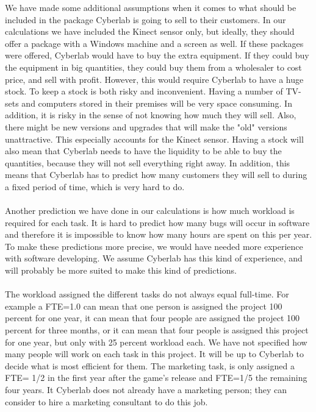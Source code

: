 We have made some additional assumptions when it comes to what should be included in the package Cyberlab is going to sell to their customers. In our calculations we have included the Kinect sensor only, but ideally, they should offer a package with a Windows machine and a screen as well. If these packages were offered, Cyberlab would have to buy the extra equipment. If they could buy the equipment in big quantities, they could buy them from a wholesaler to cost price, and sell with profit. However, this would require Cyberlab to have a huge stock. To keep a stock is both risky and inconvenient. Having a number of TV-sets and computers stored in their premises will be very space consuming. In addition, it is risky in the sense of not knowing how much they will sell. Also, there might be new versions and upgrades that will make the "old" versions unattractive. This especially accounts for the Kinect sensor. Having a stock will also mean that Cyberlab needs to have the liquidity to be able to buy the quantities, because they will not sell everything right away. In addition, this means that Cyberlab has to predict how many customers they will sell to during a fixed period of time, which is very hard to do. \\ \\
Another prediction we have done in our calculations is how much workload is required for each task. It is hard to predict how many bugs will occur in software and therefore it is impossible to know how many hours are spent on this per year. To make these predictions more precise, we would have needed more experience with software developing. We assume Cyberlab has this kind of experience, and will probably be more suited to make this kind of predictions.\\ \\
The workload assigned the different tasks do not always equal full-time. For example a FTE=1.0 can mean that one person is assigned the project 100 percent for one year, it can mean that four people are assigned the project 100 percent for three months, or it can mean that four people is assigned this project for one year, but only with 25 percent workload each. We have not specified how many people will work on each task in this project. It will be up to Cyberlab to decide what is most efficient for them. The marketing task, is only assigned a FTE= 1/2 in the first year after the game’s release and FTE=1/5 the remaining four years. It Cyberlab does not already have a marketing person; they can consider to hire a marketing consultant to do this job. \\ \\
